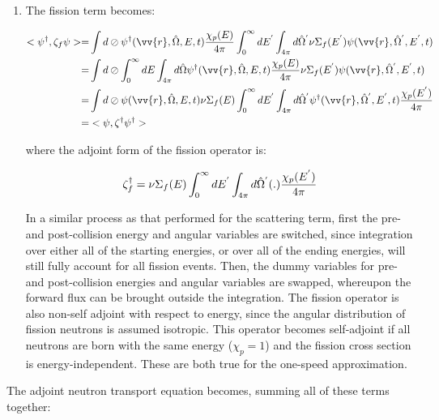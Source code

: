 \documentclass[10pt]{article}
\begin{document}
\begin{flushleft}
\begin{enumerate}
\item The fission term becomes:

\begin{equation}
\begin{aligned}
<\psi^\dagger,\zeta_f\psi>=& \int d\oslash\psi^\dagger(\vv{r},\hat{\Omega},E,t)\frac{\chi_p(E)}{4\pi}\int_0^\infty dE^{'}\int_{4\pi}d\hat{\Omega}^{'}\nu\Sigma_f(E^{'})\psi(\vv{r},\hat{\Omega}^{'},E^{'},t)\\
=& \int d\oslash\int_0^\infty dE\int_{4\pi}d\hat{\Omega}\psi^\dagger(\vv{r},\hat{\Omega},E,t)\frac{\chi_p(E)}{4\pi}\nu\Sigma_f(E^{'})\psi(\vv{r},\hat{\Omega}^{'},E^{'},t)\\
=& \int d\oslash\psi(\vv{r},\hat{\Omega},E,t)\nu\Sigma_f(E)\int_0^\infty dE^{'}\int_{4\pi}d\hat{\Omega}^{'}\psi^\dagger(\vv{r},\hat{\Omega}^{'},E^{'},t)\frac{\chi_p(E^{'})}{4\pi}\\
=& <\psi,\zeta^\dagger\psi^\dagger>\\
\end{aligned}
\end{equation}

where the adjoint form of the fission operator is:

\begin{equation}
\zeta_f^\dagger=\nu\Sigma_f(E)\int_0^\infty dE^{'}\int_{4\pi}d\hat{\Omega}^{'}(.)\frac{\chi_p(E^{'})}{4\pi}\\
\end{equation}

In a similar process as that performed for the scattering term, first the pre- and post-collision energy and angular variables are switched, since integration over either all of the starting energies, or over all of the ending energies, will still fully account for all fission events. Then, the dummy variables for pre- and post-collision energies and angular variables are swapped, whereupon the forward flux can be brought outside the integration. The fission operator is also non-self adjoint with respect to energy, since the angular distribution of fission neutrons is assumed isotropic. This operator becomes self-adjoint if all neutrons are born with the same energy (\(\chi_p=1\)) and the fission cross section is energy-independent. These are both true for the one-speed approximation.
\end{enumerate}

The adjoint neutron transport equation becomes, summing all of these terms together:


\end{flushleft}
\end{document}
